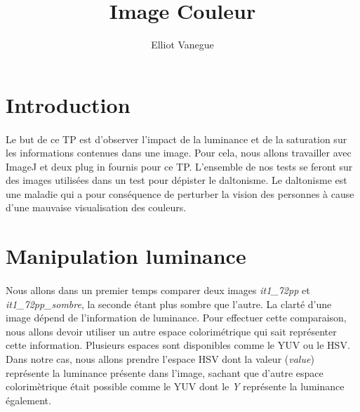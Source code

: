 \documentclass[a4paper,10pt]{article}
\title{Image Couleur}
\author{Elliot Vanegue}
\begin{document}
\maketitle
\section{Introduction}
\paragraph{}Le but de ce TP est d'observer l'impact de la luminance et de la saturation sur les informations contenues dans une image. Pour cela, nous allons travailler avec ImageJ et deux plug in fournis pour ce TP. L'ensemble de nos tests se feront sur des images
utilisées dans un test pour dépister le daltonisme. Le daltonisme est une maladie qui a pour conséquence de perturber la vision
des personnes à cause d'une mauvaise visualisation des couleurs.

\section{Manipulation luminance}
\paragraph{}Nous allons dans un premier temps comparer deux images \textit{it1\_72pp} et \textit{it1\_72pp\_sombre}, la seconde étant plus sombre que l'autre.
La clarté d'une image dépend de l'information de luminance.
Pour effectuer cette comparaison, nous allons devoir utiliser un autre espace colorimétrique qui
sait représenter cette information. Plusieurs espaces sont disponibles comme le YUV ou le HSV.
Dans notre cas, nous allons prendre l'espace HSV dont la valeur (\textit{value}) représente 
la luminance présente dans l'image, sachant que d'autre espace colorimètrique était possible comme le YUV dont le 
\textit{Y} représente la luminance également.\\
\end{document}
